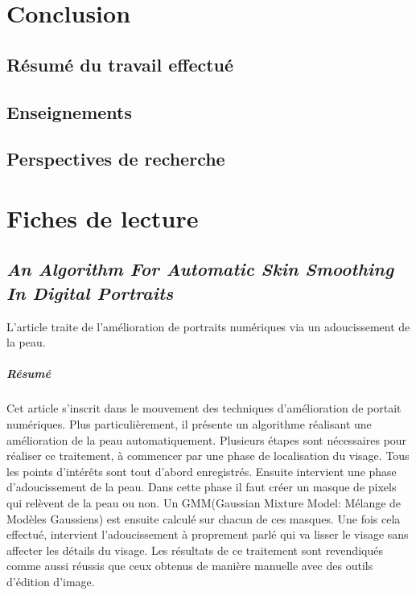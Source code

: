 \documentclass[11pt, french]{report-rd-info}
\begin{document}
\chapter{Conclusion}
\label{chap:Conclusion}



\section{Résumé du travail effectué}

\section{Enseignements}

\section{Perspectives de recherche}











\listoffigures{}
\listoftables{}
\appendix
\chapter{Fiches de lecture}
\label{ann:FichesLecture}
\section{\emph{An Algorithm For Automatic Skin Smoothing In Digital Portraits}}
L'article \cite{Lee} traite de l'amélioration de portraits numériques via un adoucissement de la peau.
\paragraph{Résumé}
Cet article s'inscrit dans le mouvement des techniques d'amélioration de portait numériques.
Plus particulièrement, il présente un algorithme réalisant une amélioration de la peau automatiquement.
Plusieurs étapes sont nécessaires pour réaliser ce traitement, à commencer par une phase de localisation du visage.
Tous les points d'intérêts sont tout d'abord enregistrés. Ensuite intervient une phase d'adoucissement de la peau.
Dans cette phase il faut créer un masque de pixels qui relèvent de la peau ou non.
Un GMM(Gaussian Mixture Model: Mélange de Modèles Gaussiens) est ensuite calculé sur chacun de ces masques.
Une fois cela effectué, intervient l'adoucissement à proprement parlé qui va lisser le visage sans affecter les détails du visage.
Les résultats de ce traitement sont revendiqués comme aussi réussis que ceux obtenus de manière manuelle avec des outils d'édition d'image.
\end{document}
